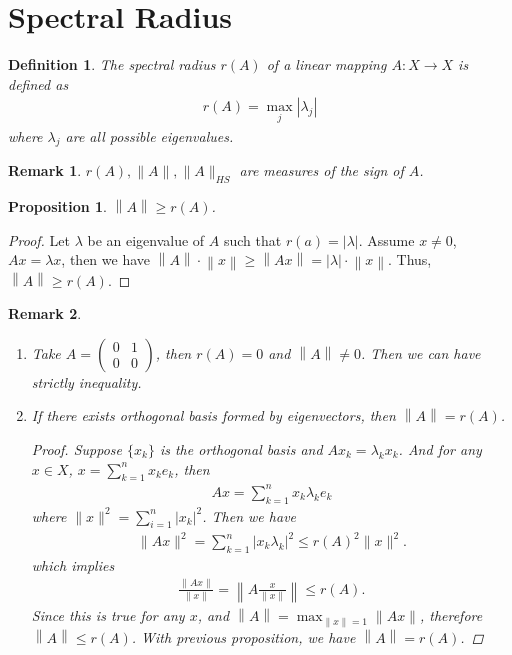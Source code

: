 \documentclass[11pt]{book}
\newtheorem{definition}{Definition}[chapter]
\newtheorem{proposition}{Proposition}[chapter]
\newtheorem{remark}{Remark}[chapter]
\theoremstyle{definition}
\numberwithin{equation}{chapter}
\begin{document}
\medskip

\section{Spectral Radius}

\begin{definition}
The spectral radius $r(A)$ of a linear mapping $A:X\to X$ is defined as
\begin{align*}
    r(A) = \max_{j} \left|\lambda_j \right|
\end{align*}
where $\lambda_j$ are all possible eigenvalues.
\end{definition}

\begin{remark}
$r(A), \|A\|, \|A\|_{HS}$ are measures of the sign of $A$.
\end{remark}

\medskip

\begin{proposition}
$\left\|A\right\| \geq r(A)$.
\end{proposition}
\begin{proof}
Let $\lambda$ be an eigenvalue of $A$ such that $r(a) = \left|\lambda\right|$. Assume $x\neq 0$, $Ax = \lambda x$, then we have $\left\|A\right\|\cdot \left\|x\right\| \geq \left\|Ax\right\| = |\lambda|\cdot \left\|x\right\|$. Thus, $\left\|A\right\| \geq r(A)$.
\end{proof}

\medskip

\begin{remark}\label{remark_792}
~\begin{enumerate}[label=(\alph*)]
    \item Take $A = \begin{pmatrix}
    0 & 1  \\
    0 & 0  
    \end{pmatrix}$, then $r(A) = 0$ and $\left\|A\right\| \neq 0$. Then we can have strictly inequality.
    \item If there exists orthogonal basis formed by eigenvectors, then $\left\|A\right\| = r(A)$.
    \begin{proof}
    Suppose $\{x_k\}$ is the orthogonal basis and $Ax_k = \lambda_k x_k$. And for any $x\in X$, $x = \sum^n_{k=1}x_k e_k$, then 
    \begin{align*}
        Ax = \sum^n_{k=1} x_k \lambda_k e_k
    \end{align*}
    where $\|x\|^2 = \sum^n_{i=1}|x_k|^2$. Then we have 
    \begin{align*}
        \|Ax\|^2 = \sum^n_{k=1} |x_k \lambda_k|^2 \leq r(A)^2 \|x\|^2. 
    \end{align*} 
    which implies 
    \begin{align*}
        \frac{\|Ax\|}{\|x\|} = \left\|A \frac{x}{\|x\|}\right\| \leq r(A).
    \end{align*}
    Since this is true for any $x$, and $\left\|A\right\| = \max_{\|x\|=1}\|Ax\|$, therefore $\left\|A\right\| \leq r(A)$. With previous proposition, we have $\left\|A\right\| = r(A)$.
    \end{proof}
\end{enumerate}
\end{remark}
\end{document}
